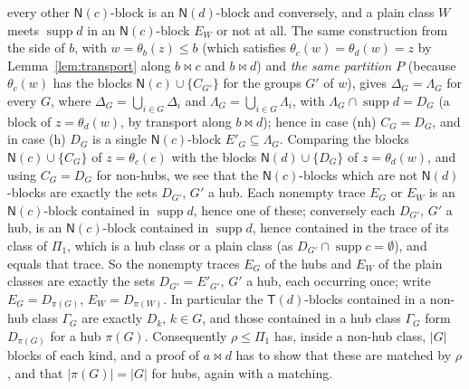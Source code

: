 \documentclass[11pt]{amsart}
\theoremstyle{definition}
\newcommand{\supp}{\operatorname{supp}}
\newcommand{\T}{\mathsf{T}}
\newcommand{\N}{\mathsf{N}}
\newcommand{\mt}{\bowtie}      %
\begin{document}
every other $\N(c)$-block is an $\N(d)$-block and conversely, and a plain class $W$ meets $\supp d$ in an $\N(c)$-block $E_W$ or not at all. The same construction from the side of $b$, with $w=\theta_b(z)\le b$ (which satisfies $\theta_c(w)=\theta_d(w)=z$ by Lemma~\ref{lem:transport} along $b\mt c$ and $b\mt d$) and \emph{the same partition $P$} (because $\theta_c(w)$ has the blocks $\N(c)\cup\{C_{G'}\}$ for the groups $G'$ of $w$), gives $\Delta_G=\Lambda_G$ for every $G$, where $\Delta_G=\bigcup_{i\in G}\Delta_i$ and $\Lambda_G=\bigcup_{i\in G}\Lambda_i$, with $\Lambda_G\cap\supp d=D_G$ (a block of $z=\theta_d(w)$, by transport along $b\mt d$); hence in case (nh) $C_G=D_G$, and in case (h) $D_G$ is a single $\N(c)$-block $E'_G\subseteq\Lambda_G$. Comparing the blocks $\N(c)\cup\{C_G\}$ of $z=\theta_c(e)$ with the blocks $\N(d)\cup\{D_G\}$ of $z=\theta_d(w)$, and using $C_G=D_G$ for non-hubs, we see that the $\N(c)$-blocks which are not $\N(d)$-blocks are exactly the sets $D_{G'}$, $G'$ a hub. Each nonempty trace $E_G$ or $E_W$ is an $\N(c)$-block contained in $\supp d$, hence one of these; conversely each $D_{G'}$, $G'$ a hub, is an $\N(c)$-block contained in $\supp d$, hence contained in the trace of its class of $\Pi_1$, which is a hub class or a plain class (as $D_{G'}\cap\supp c=\emptyset$), and equals that trace. So the nonempty traces $E_G$ of the hubs and $E_W$ of the plain classes are exactly the sets $D_{G'}=E'_{G'}$, $G'$ a hub, each occurring once; write $E_G=D_{\pi(G)}$, $E_W=D_{\pi(W)}$. In particular the $\T(d)$-blocks contained in a non-hub class $\Gamma_G$ are exactly $D_k$, $k\in G$, and those contained in a hub class $\Gamma_G$ form $D_{\pi(G)}$ for a hub $\pi(G)$. Consequently $\rho\le\Pi_1$ has, inside a non-hub class, $|G|$ blocks of each kind, and a proof of $a\mt d$ has to show that these are matched by $\rho$, and that $|\pi(G)|=|G|$ for hubs, again with a matching.
\end{document}
